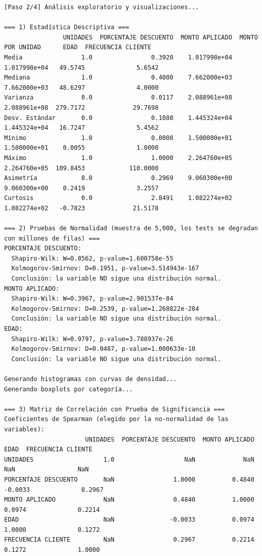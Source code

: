 \documentclass[12pt,letterpaper]{article}
\begin{document}
\begin{Verbatim}[breaklines=true,breakanywhere=true,fontsize=\scriptsize,breaksymbolleft={\tiny\ensuremath{\hookrightarrow}}]
[Paso 2/4] Análisis exploratorio y visualizaciones...

=== 1) Estadística Descriptiva ===
                UNIDADES  PORCENTAJE DESCUENTO  MONTO APLICADO  MONTO POR UNIDAD      EDAD  FRECUENCIA CLIENTE
Media                1.0                0.3920    1.017998e+04      1.017998e+04   49.5745              5.6542
Mediana              1.0                0.4000    7.662000e+03      7.662000e+03   48.6297              4.0000
Varianza             0.0                0.0117    2.088961e+08      2.088961e+08  279.7172             29.7698
Desv. Estándar       0.0                0.1080    1.445324e+04      1.445324e+04   16.7247              5.4562
Mínimo               1.0                0.0000    1.500000e+01      1.500000e+01    0.0055              1.0000
Máximo               1.0                1.0000    2.264760e+05      2.264760e+05  109.8453            110.0000
Asimetría            0.0                0.2969    9.060300e+00      9.060300e+00    0.2419              3.2557
Curtosis             0.0                2.8491    1.082274e+02      1.082274e+02   -0.7823             21.5178

=== 2) Pruebas de Normalidad (muestra de 5,000, los tests se degradan con millones de filas) ===
PORCENTAJE DESCUENTO:
  Shapiro-Wilk: W=0.8562, p-value=1.600758e-55
  Kolmogorov-Smirnov: D=0.1951, p-value=3.514943e-167
  Conclusión: la variable NO sigue una distribución normal.
MONTO APLICADO:
  Shapiro-Wilk: W=0.3967, p-value=2.901537e-84
  Kolmogorov-Smirnov: D=0.2539, p-value=1.268822e-284
  Conclusión: la variable NO sigue una distribución normal.
EDAD:
  Shapiro-Wilk: W=0.9797, p-value=3.788937e-26
  Kolmogorov-Smirnov: D=0.0487, p-value=1.000633e-10
  Conclusión: la variable NO sigue una distribución normal.

Generando histogramas con curvas de densidad...
Generando boxplots por categoría...

=== 3) Matriz de Correlación con Prueba de Significancia ===
Coeficientes de Spearman (elegido por la no-normalidad de las variables):
                      UNIDADES  PORCENTAJE DESCUENTO  MONTO APLICADO    EDAD  FRECUENCIA CLIENTE
UNIDADES                   1.0                   NaN             NaN     NaN                 NaN
PORCENTAJE DESCUENTO       NaN                1.0000          0.4840 -0.0033              0.2967
MONTO APLICADO             NaN                0.4840          1.0000  0.0974              0.2214
EDAD                       NaN               -0.0033          0.0974  1.0000              0.1272
FRECUENCIA CLIENTE         NaN                0.2967          0.2214  0.1272              1.0000


\end{Verbatim}
\end{document}
